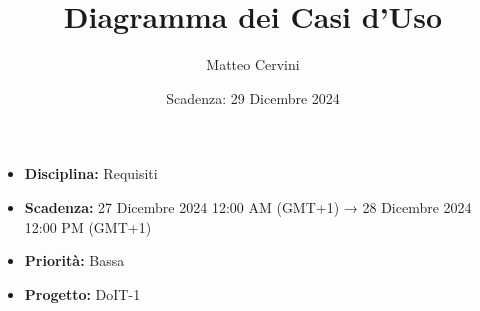 \title{Diagramma dei Casi d'Uso}
\author{Matteo Cervini}
\date{Scadenza: 29 Dicembre 2024}

\maketitle

\begin{itemize}
    \item \textbf{Disciplina:} Requisiti
    \item \textbf{Scadenza:} 27 Dicembre 2024 12:00 AM (GMT+1) → 28 Dicembre 2024 12:00 PM (GMT+1)
    \item \textbf{Priorità:} Bassa
    \item \textbf{Progetto:} DoIT-1
\end{itemize}